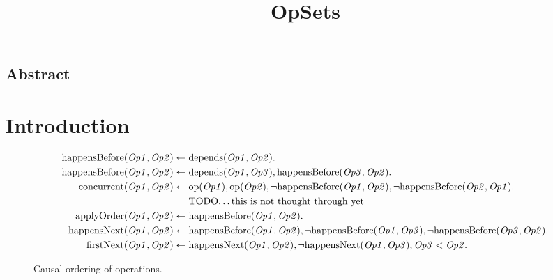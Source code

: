 \documentclass[twocolumn,10pt]{article}
\begin{document}
\sloppy
\title{OpSets}
\author{}
\date{}
\maketitle

\subsection*{Abstract}

\section{Introduction}

\cite{Attiya:2016kh}


\begin{figure*}
\begin{align*}
    \mathrm{happensBefore}(\mathit{Op1}, \mathit{Op2}) \leftarrow\; &
    \mathrm{depends}(\mathit{Op1}, \mathit{Op2}).
\\
    \mathrm{happensBefore}(\mathit{Op1}, \mathit{Op2}) \leftarrow\; &
    \mathrm{depends}(\mathit{Op1}, \mathit{Op3}),
    \mathrm{happensBefore}(\mathit{Op3}, \mathit{Op2}).
\\
    \mathrm{concurrent}(\mathit{Op1}, \mathit{Op2}) \leftarrow\; &
    \mathrm{op}(\mathit{Op1}), \mathrm{op}(\mathit{Op2}),
    \neg\mathrm{happensBefore}(\mathit{Op1}, \mathit{Op2}),
    \neg\mathrm{happensBefore}(\mathit{Op2}, \mathit{Op1}).
\\
    & \text{TODO\dots this is not thought through yet}
\\
    \mathrm{applyOrder}(\mathit{Op1}, \mathit{Op2}) \leftarrow\; &
    \mathrm{happensBefore}(\mathit{Op1}, \mathit{Op2}).
\\
    \mathrm{happensNext}(\mathit{Op1}, \mathit{Op2}) \leftarrow\; &
    \mathrm{happensBefore}(\mathit{Op1}, \mathit{Op2}),
    \neg\mathrm{happensBefore}(\mathit{Op1}, \mathit{Op3}),
    \neg\mathrm{happensBefore}(\mathit{Op3}, \mathit{Op2}).
\\
    \mathrm{firstNext}(\mathit{Op1}, \mathit{Op2}) \leftarrow\; &
    \mathrm{happensNext}(\mathit{Op1}, \mathit{Op2}),
    \neg\mathrm{happensNext}(\mathit{Op1}, \mathit{Op3}), \mathit{Op3} < \mathit{Op2}.
\end{align*}
\caption{Causal ordering of operations.}
\end{figure*}
\end{document}
